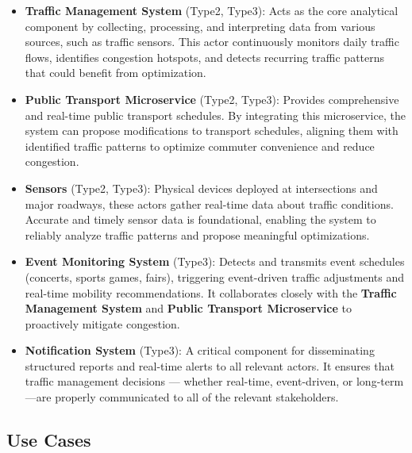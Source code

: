 \documentclass[a4paper,12pt]{article}
\begin{document}
\begin{itemize}
    \item \textbf{Traffic Management System} (Type2, Type3): Acts as the core analytical component by collecting, processing, and interpreting data from various sources, such as traffic sensors. This actor continuously monitors daily traffic flows, identifies congestion hotspots, and detects recurring traffic patterns that could benefit from optimization.
    \item \textbf{Public Transport Microservice} (Type2, Type3): Provides comprehensive and real-time public transport schedules. By integrating this microservice, the system can propose modifications to transport schedules, aligning them with identified traffic patterns to optimize commuter convenience and reduce congestion.
    \item \textbf{Sensors} (Type2, Type3): Physical devices deployed at intersections and major roadways, these actors gather real-time data about traffic conditions. Accurate and timely sensor data is foundational, enabling the system to reliably analyze traffic patterns and propose meaningful optimizations.
    \item \textbf{Event Monitoring System} (Type3): Detects and transmits event schedules (concerts, sports games, fairs), triggering event-driven traffic adjustments and real-time mobility recommendations. It collaborates closely with the \textbf{Traffic Management System} and \textbf{Public Transport Microservice} to proactively mitigate congestion.
    \item \textbf{Notification System} (Type3): A critical component for disseminating structured reports and real-time alerts to all relevant actors. It ensures that traffic management decisions — whether real-time, event-driven, or long-term —are properly communicated to all of the relevant stakeholders.
\end{itemize}

\newpage

\subsection{Use Cases}
\end{document}
